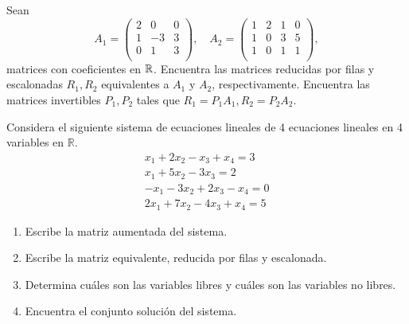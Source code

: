 \documentclass[12pt,a4paper]{book}
\begin{document}
    \begin{ejercicio}
        Sean
        \begin{equation*}
        A_{1} =
        \begin{pmatrix}
            2 & 0 & 0\\
            1 & -3 & 3\\
            0 & 1 & 3\\
        \end{pmatrix}
        , \quad A_{2} =
        \begin{pmatrix}
            1 & 2 & 1 & 0\\
            1 & 0 & 3 & 5\\
            1 & 0 & 1 & 1\\
        \end{pmatrix}
        ,
        \end{equation*}
        matrices con coeficientes en $\mathbb{R}$. Encuentra las matrices reducidas por filas y escalonadas $R_{1}, R_{2}$ equivalentes a $A_{1}$ y $A_{2}$, respectivamente. Encuentra las matrices invertibles $P_{1}, P_{2}$ tales que $R_{1} = P_{1}A_{1}, R_{2} = P_{2} A_{2}$.
    \end{ejercicio}

    \begin{ejercicio}
        Considera el siguiente sistema de ecuaciones lineales de 4
        ecuaciones lineales en 4 variables en $\mathbb{R}$.
        \begin{equation*}
            \begin{matrix}
                x_{1}+2x_{2}-x_{3}+x_{4}=3\\
                x_{1}+5x_{2}-3x_{3}=2\\
                -x_{1}-3x_{2}+2x_{3}-x_{4}=0\\
                2x_{1}+7x_{2}-4x_{3}+x_{4}=5
            \end{matrix}
        \end{equation*}
        \begin{enumerate}
            \item[(a)] Escribe la matriz aumentada del sistema.
            \item[(b)] Escribe la matriz equivalente, reducida por filas y escalonada.
            \item[(c)] Determina cuáles son las variables libres y cuáles son las variables no libres.
            \item[(d)] Encuentra el conjunto solución del sistema.
        \end{enumerate}
    \end{ejercicio}
\end{document}
